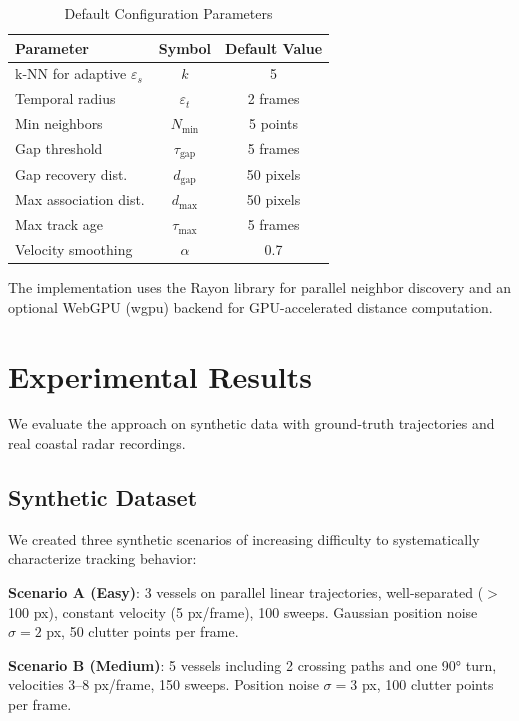 \documentclass[conf]{new-aiaa}
\begin{document}
\begin{table}[hbt!]
\caption{Default Configuration Parameters}
\label{tab:params}
\centering
\small
\begin{tabular}{lcc}
\toprule
Parameter & Symbol & Default Value \\
\midrule
k-NN for adaptive $\varepsilon_s$ & $k$ & 5 \\
Temporal radius & $\varepsilon_t$ & 2 frames \\
Min neighbors & $N_{\min}$ & 5 points \\
Gap threshold & $\tau_{\text{gap}}$ & 5 frames \\
Gap recovery dist. & $d_{\text{gap}}$ & 50 pixels \\
Max association dist. & $d_{\max}$ & 50 pixels \\
Max track age & $\tau_{\max}$ & 5 frames \\
Velocity smoothing & $\alpha$ & 0.7 \\
\bottomrule
\end{tabular}
\end{table}

The implementation uses the Rayon library for parallel neighbor discovery and an optional WebGPU (wgpu) backend for GPU-accelerated distance computation.

\section{Experimental Results}

We evaluate the approach on synthetic data with ground-truth trajectories and real coastal radar recordings.

\subsection{Synthetic Dataset}

We created three synthetic scenarios of increasing difficulty to systematically characterize tracking behavior:

\textbf{Scenario A (Easy)}: 3 vessels on parallel linear trajectories, well-separated ($>$100 px), constant velocity (5 px/frame), 100 sweeps. Gaussian position noise $\sigma = 2$ px, 50 clutter points per frame.

\textbf{Scenario B (Medium)}: 5 vessels including 2 crossing paths and one 90° turn, velocities 3--8 px/frame, 150 sweeps. Position noise $\sigma = 3$ px, 100 clutter points per frame.
\end{document}
